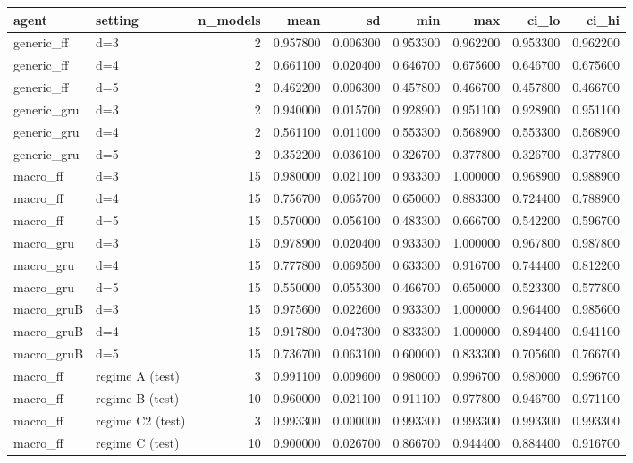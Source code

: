 \begin{tabular}{llrrrrrrr}
\toprule
agent & setting & n\_models & mean & sd & min & max & ci\_lo & ci\_hi \\
\midrule
generic\_ff & d=3 & 2 & 0.957800 & 0.006300 & 0.953300 & 0.962200 & 0.953300 & 0.962200 \\
generic\_ff & d=4 & 2 & 0.661100 & 0.020400 & 0.646700 & 0.675600 & 0.646700 & 0.675600 \\
generic\_ff & d=5 & 2 & 0.462200 & 0.006300 & 0.457800 & 0.466700 & 0.457800 & 0.466700 \\
generic\_gru & d=3 & 2 & 0.940000 & 0.015700 & 0.928900 & 0.951100 & 0.928900 & 0.951100 \\
generic\_gru & d=4 & 2 & 0.561100 & 0.011000 & 0.553300 & 0.568900 & 0.553300 & 0.568900 \\
generic\_gru & d=5 & 2 & 0.352200 & 0.036100 & 0.326700 & 0.377800 & 0.326700 & 0.377800 \\
macro\_ff & d=3 & 15 & 0.980000 & 0.021100 & 0.933300 & 1.000000 & 0.968900 & 0.988900 \\
macro\_ff & d=4 & 15 & 0.756700 & 0.065700 & 0.650000 & 0.883300 & 0.724400 & 0.788900 \\
macro\_ff & d=5 & 15 & 0.570000 & 0.056100 & 0.483300 & 0.666700 & 0.542200 & 0.596700 \\
macro\_gru & d=3 & 15 & 0.978900 & 0.020400 & 0.933300 & 1.000000 & 0.967800 & 0.987800 \\
macro\_gru & d=4 & 15 & 0.777800 & 0.069500 & 0.633300 & 0.916700 & 0.744400 & 0.812200 \\
macro\_gru & d=5 & 15 & 0.550000 & 0.055300 & 0.466700 & 0.650000 & 0.523300 & 0.577800 \\
macro\_gruB & d=3 & 15 & 0.975600 & 0.022600 & 0.933300 & 1.000000 & 0.964400 & 0.985600 \\
macro\_gruB & d=4 & 15 & 0.917800 & 0.047300 & 0.833300 & 1.000000 & 0.894400 & 0.941100 \\
macro\_gruB & d=5 & 15 & 0.736700 & 0.063100 & 0.600000 & 0.833300 & 0.705600 & 0.766700 \\
macro\_ff & regime A (test) & 3 & 0.991100 & 0.009600 & 0.980000 & 0.996700 & 0.980000 & 0.996700 \\
macro\_ff & regime B (test) & 10 & 0.960000 & 0.021100 & 0.911100 & 0.977800 & 0.946700 & 0.971100 \\
macro\_ff & regime C2 (test) & 3 & 0.993300 & 0.000000 & 0.993300 & 0.993300 & 0.993300 & 0.993300 \\
macro\_ff & regime C (test) & 10 & 0.900000 & 0.026700 & 0.866700 & 0.944400 & 0.884400 & 0.916700 \\

\end{tabular}
